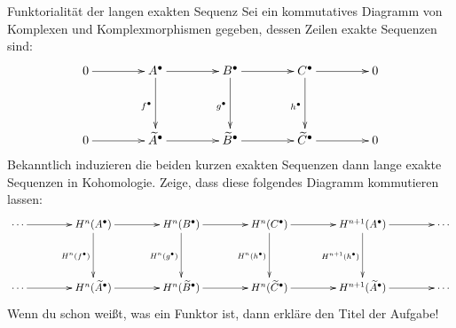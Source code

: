 \documentclass{uebblatt}
\begin{document}

\begin{aufgabe}{Funktorialität der langen exakten Sequenz}
Sei ein kommutatives Diagramm von Komplexen und Komplexmorphismen gegeben,
dessen Zeilen exakte Sequenzen sind:
\[ \xymatrixcolsep{3.5pc}\xymatrixrowsep{3.5pc}\xymatrix{
  0 \ar[r]
    & A^\bullet \ar[r] \ar[d]_{f^\bullet}
    & B^\bullet \ar[r] \ar[d]_{g^\bullet}
    & C^\bullet \ar[r] \ar[d]_{h^\bullet}
    & 0 \\
  0 \ar[r]
    & \widetilde A^\bullet \ar[r]
    & \widetilde B^\bullet \ar[r]
    & \widetilde C^\bullet \ar[r]
    & 0
} \]
Bekanntlich induzieren die beiden kurzen exakten Sequenzen dann lange exakte
Sequenzen in Kohomologie. Zeige, dass diese folgendes Diagramm kommutieren
lassen:
\[ \xymatrixcolsep{3.5pc}\xymatrixrowsep{3.5pc}\xymatrix{
  \cdots \ar[r]
    & H^n(A^\bullet) \ar[r] \ar[d]_{H^n(f^\bullet)}
    & H^n(B^\bullet) \ar[r] \ar[d]_{H^n(g^\bullet)}
    & H^n(C^\bullet) \ar[r] \ar[d]_{H^n(h^\bullet)}
    & H^{n+1}(A^\bullet) \ar[r] \ar[d]_{H^{n+1}(h^\bullet)}
    & \cdots \\
  \cdots \ar[r]
    & H^n(\widetilde A^\bullet) \ar[r]
    & H^n(\widetilde B^\bullet) \ar[r]
    & H^n(\widetilde C^\bullet) \ar[r]
    & H^{n+1}(\widetilde A^\bullet) \ar[r]
    & \cdots
} \]
Wenn du schon weißt, was ein Funktor ist, dann erkläre den Titel der Aufgabe!
\end{aufgabe}
\end{document}
